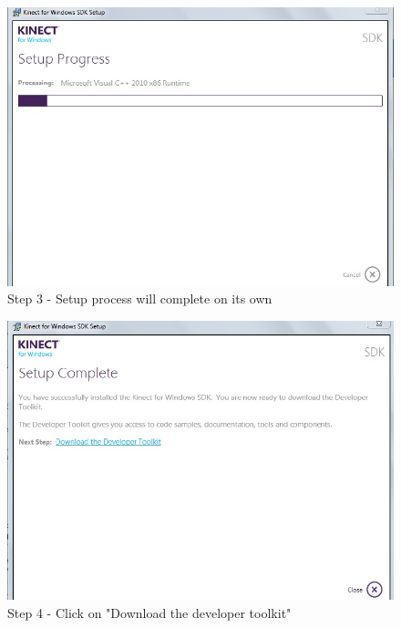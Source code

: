 \begin{flushleft}
\medskip
\begin{figure}
\begin{center}
\includegraphics[scale=0.7]{sdk_step2}
\end{center}
\caption{Step 3 - Setup process will complete on its own}
\label{fig:w4}
\end{figure}
\medskip
\begin{figure}
\begin{center}
\includegraphics[scale=0.7]{sdk_step3}
\end{center}
\caption{Step 4 - Click on "Download the developer toolkit"}
\label{fig:w5}
\end{figure}


\end{flushleft}
